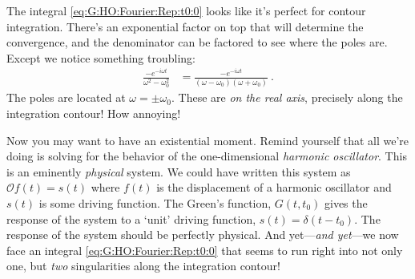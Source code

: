 The integral \eqref{eq:G:HO:Fourier:Rep:t0:0} looks like it's perfect for contour integration. There's an exponential factor on top that will determine the convergence, and the denominator can be factored to see where the poles are. Except we notice something troubling:
\begin{align}
	\frac{-e^{-i\omega t}}{\omega^2-\omega_0^2} 
	&=
	\frac{-e^{-i\omega t}}{(\omega - \omega_0)(\omega + \omega_0)} \ .
\end{align}
The poles are located at $\omega = \pm \omega_0$. These are \emph{on the real axis}, precisely along the integration contour! How annoying!

Now you may want to have an existential moment. Remind yourself that all we're doing is solving for the behavior of the one-dimensional \emph{harmonic oscillator}. This is an eminently \emph{physical} system. We could have written this system as $\mathcal O f(t) = s(t)$ where $f(t)$ is the displacement of a harmonic oscillator and $s(t)$ is some driving function. The Green's function, $G(t,t_0)$ gives the response of the system to a `unit' driving function, $s(t) = \delta(t-t_0)$. The response of the system should be perfectly physical. And yet---\emph{and yet}---we now face an integral \eqref{eq:G:HO:Fourier:Rep:t0:0} that seems to run right into not only one, but \emph{two} singularities along the integration contour!




